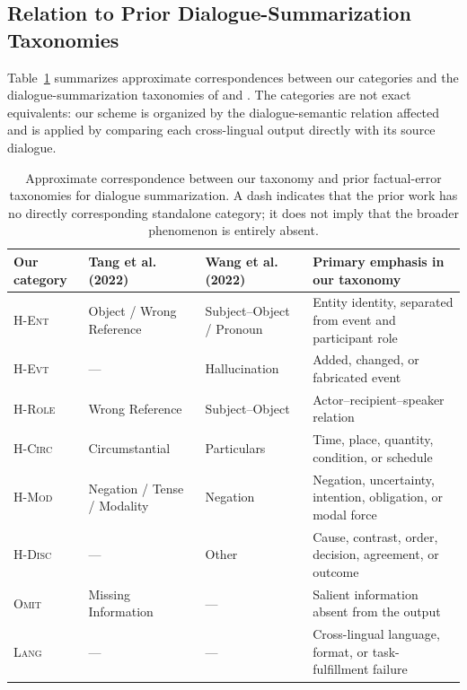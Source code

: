 \documentclass[11pt]{article}
\begin{document}
\FloatBarrier

\subsection{Relation to Prior Dialogue-Summarization Taxonomies}
\label{sec:appendix-taxonomy-comparison}

Table~\ref{tab:taxonomy-comparison} summarizes approximate correspondences between our categories and the dialogue-summarization taxonomies of \citet{tang-etal-2022-confit} and \citet{wang-etal-2022-analyzing}. The categories are not exact equivalents: our scheme is organized by the dialogue-semantic relation affected and is applied by comparing each cross-lingual output directly with its source dialogue.

\begin{table}[t]
\centering
\scriptsize
\setlength{\tabcolsep}{4pt}
\begin{tabularx}{\textwidth}{@{}lXXX@{}}
\toprule
Our category & Tang et al. (2022) & Wang et al. (2022) & Primary emphasis in our taxonomy \\
\midrule
\textsc{H-Ent}  & Object / Wrong Reference & Subject--Object / Pronoun & Entity identity, separated from event and participant role \\
\textsc{H-Evt}  & --- & Hallucination & Added, changed, or fabricated event \\
\textsc{H-Role} & Wrong Reference & Subject--Object & Actor--recipient--speaker relation \\
\textsc{H-Circ} & Circumstantial & Particulars & Time, place, quantity, condition, or schedule \\
\textsc{H-Mod}  & Negation / Tense / Modality & Negation & Negation, uncertainty, intention, obligation, or modal force \\
\textsc{H-Disc} & --- & Other & Cause, contrast, order, decision, agreement, or outcome \\
\textsc{Omit}   & Missing Information & --- & Salient information absent from the output \\
\textsc{Lang}   & --- & --- & Cross-lingual language, format, or task-fulfillment failure \\
\bottomrule
\end{tabularx}
\caption{Approximate correspondence between our taxonomy and prior factual-error taxonomies for dialogue summarization. A dash indicates that the prior work has no directly corresponding standalone category; it does not imply that the broader phenomenon is entirely absent.}
\label{tab:taxonomy-comparison}
\end{table}
\end{document}
